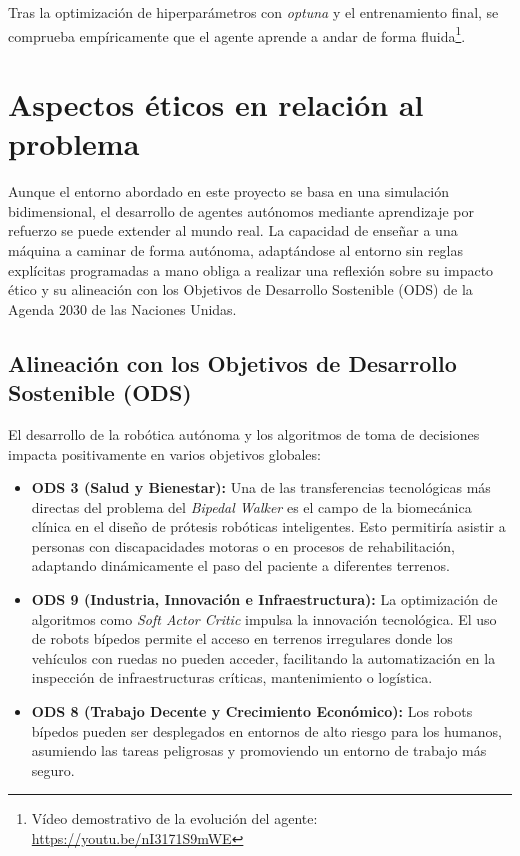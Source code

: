 \documentclass[11pt,a4paper]{article}
\begin{document}
	Tras la optimización de hiperparámetros con \textit{optuna} y el entrenamiento final, se comprueba empíricamente que el agente aprende a andar de forma fluida\footnote{Vídeo demostrativo de la evolución del agente: \url{https://youtu.be/nI3171S9mWE}}.
	

	\section{Aspectos éticos en relación al problema}
	
	Aunque el entorno abordado en este proyecto se basa en una simulación bidimensional, el desarrollo de agentes autónomos mediante aprendizaje por refuerzo se puede extender al mundo real. La capacidad de enseñar a una máquina a caminar de forma autónoma, adaptándose al entorno sin reglas explícitas programadas a mano obliga a realizar una reflexión sobre su impacto ético y su alineación con los Objetivos de Desarrollo Sostenible (ODS) de la Agenda 2030 de las Naciones Unidas.
	
	\subsection{Alineación con los Objetivos de Desarrollo Sostenible (ODS)}
	
	El desarrollo de la robótica autónoma y los algoritmos de toma de decisiones impacta positivamente en varios objetivos globales:
	
	\begin{itemize}
		\item \textbf{ODS 3 (Salud y Bienestar):} Una de las transferencias tecnológicas más directas del problema del \textit{Bipedal Walker} es el campo de la biomecánica clínica en el diseño de prótesis robóticas inteligentes. Esto permitiría asistir a personas con discapacidades motoras o en procesos de rehabilitación, adaptando dinámicamente el paso del paciente a diferentes terrenos.
		\item \textbf{ODS 9 (Industria, Innovación e Infraestructura):} La optimización de algoritmos como \textit{Soft Actor Critic} impulsa la innovación tecnológica. El uso de robots bípedos permite el acceso en terrenos irregulares donde los vehículos con ruedas no pueden acceder, facilitando la automatización en la inspección de infraestructuras críticas, mantenimiento o logística.
		\item \textbf{ODS 8 (Trabajo Decente y Crecimiento Económico):} Los robots bípedos pueden ser desplegados en entornos de alto riesgo para los humanos, asumiendo las tareas peligrosas y promoviendo un entorno de trabajo más seguro.
	\end{itemize}
	
\end{document}
